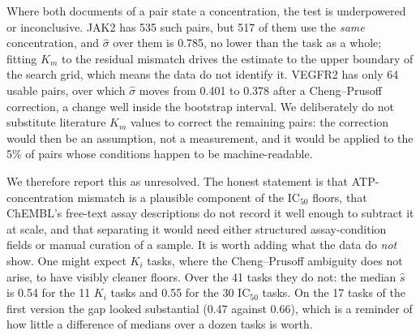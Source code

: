 Where both documents of a pair state a concentration, the test is underpowered or inconclusive. JAK2 has 535 such pairs, but 517 of them use the \emph{same} concentration, and $\hat\sigma$ over them is 0.785, no lower than the task as a whole; fitting $K_m$ to the residual mismatch drives the estimate to the upper boundary of the search grid, which means the data do not identify it. VEGFR2 has only 64 usable pairs, over which $\hat\sigma$ moves from 0.401 to 0.378 after a Cheng--Prusoff correction, a change well inside the bootstrap interval. We deliberately do not substitute literature $K_m$ values to correct the remaining pairs: the correction would then be an assumption, not a measurement, and it would be applied to the 5\% of pairs whose conditions happen to be machine-readable.

We therefore report this as unresolved. The honest statement is that ATP-concentration mismatch is a plausible component of the $\mathrm{IC}_{50}$ floors, that ChEMBL's free-text assay descriptions do not record it well enough to subtract it at scale, and that separating it would need either structured assay-condition fields or manual curation of a sample. It is worth adding what the data do \emph{not} show. One might expect $K_i$ tasks, where the Cheng--Prusoff ambiguity does not arise, to have visibly cleaner floors. Over the 41 tasks they do not: the median $\hat s$ is 0.54 for the 11 $K_i$ tasks and 0.55 for the 30 $\mathrm{IC}_{50}$ tasks. On the 17 tasks of the first version the gap looked substantial (0.47 against 0.66), which is a reminder of how little a difference of medians over a dozen tasks is worth.
